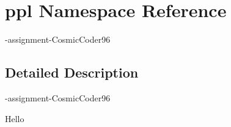 \hypertarget{namespaceppl}{}\section{ppl Namespace Reference}
\label{namespaceppl}


-\/assignment-\/\+Cosmic\+Coder96  




\subsection{Detailed Description}
-\/assignment-\/\+Cosmic\+Coder96 

\begin{DoxyVerb}Hello
\end{DoxyVerb}
 